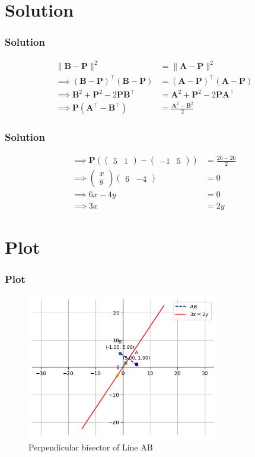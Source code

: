 \documentclass{beamer}
\providecommand{\brak}[1]{\ensuremath{\left(#1\right)}}
\theoremstyle{remark}
\providecommand{\norm}[1]{\lVert#1\rVert}
\newcommand{\myvec}[1]{\ensuremath{\begin{pmatrix}#1\end{pmatrix}}}
\let\vec\mathbf
\numberwithin{equation}{section}
\begin{document}
\section{Solution}
\begin{frame}
\frametitle{Solution}
\begin{align}
	\norm{ \vec B-\vec P }^2 &= \norm{ \vec A -\vec P }^2 \\
	\implies \brak{\vec B-\vec P}^\top\brak{\vec B-\vec P}&= \brak{\vec A-\vec P}^\top\brak{\vec A-\vec P}\\
    \implies \vec B^{2} + \vec P^{2} - 2 \vec P\vec B^\top &= \vec A^2 + \vec P^2 - 2\vec P\vec A^\top \\
    \implies \vec P\brak{\vec A^\top - \vec B^\top} &= \frac{\vec A^2 - \vec B^2}{2}
\end{align}
\end{frame}
\begin{frame}
\frametitle{Solution}
\begin{align}
 \implies \vec P\brak{\myvec{5 & 1} - \myvec{-1 & 5}} &= \frac{26 - 26}{2} \\
    \implies \myvec{x\\y}\myvec{6 & -4} &= 0\\
    \implies 6x-4y &= 0\\
    \implies 3x &= 2y
\end{align}
\end{frame}
\section{Plot}
\begin{frame}
	\frametitle{Plot}
	\begin{figure}[H]
    \centering
	\includegraphics[width=0.75\textwidth]{plots/plot.png}
    \caption{Perpendicular bisector of Line AB}
    \end{figure}   
%
\end{frame}
\end{document}
